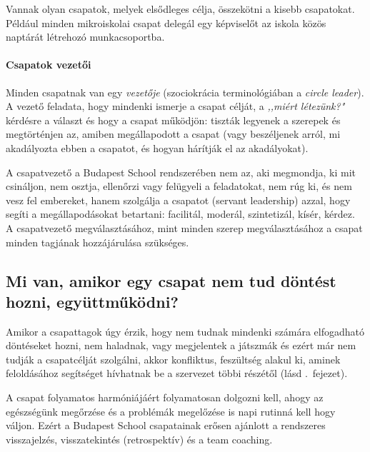 Vannak olyan csapatok, melyek elsődleges célja, összekötni a kisebb
csapatokat. Például minden mikroiskolai csapat delegál egy képviselőt az
iskola közös naptárát létrehozó munkacsoportba.


\paragraph{Csapatok vezetői}

Minden csapatnak van egy \emph{vezetője} (szociokrácia terminológiában a
\emph{circle leader}). A vezető feladata, hogy mindenki ismerje a csapat
célját, a \emph{,,miért létezünk?"} kérdésre a választ és hogy a csapat
működjön: tiszták legyenek a szerepek és megtörténjen az, amiben
megállapodott a csapat (vagy beszéljenek arról, mi akadályozta ebben a
csapatot, és hogyan hárítják el az akadályokat).

A csapatvezető a Budapest School rendszerében nem az, aki megmondja, ki
mit csináljon, nem osztja, ellenőrzi vagy felügyeli a feladatokat, nem
rúg ki, és nem vesz fel embereket, hanem szolgálja a csapatot (servant
leadership) azzal, hogy segíti a megállapodásokat betartani: facilitál,
moderál, szintetizál, kísér, kérdez. A csapatvezető megválasztásához,
mint minden szerep megválasztásához a csapat minden tagjának
hozzájárulása szükséges.


\subsection{Mi van, amikor egy csapat nem tud döntést hozni,
együttműködni?}

Amikor a csapattagok úgy érzik, hogy nem tudnak mindenki számára
elfogadható döntéseket hozni, nem haladnak, vagy megjelentek a játszmák
és ezért már nem tudják a csapatcélját szolgálni, akkor konfliktus,
feszültség alakul ki, aminek feloldásához segítséget hívhatnak be a
szervezet többi részétől (lásd .~fejezet).

A csapat folyamatos harmóniájáért folyamatosan dolgozni kell, ahogy az
egészségünk megőrzése és a problémák megelőzése is napi rutinná kell
hogy váljon. Ezért a Budapest School csapatainak erősen ajánlott a
rendszeres visszajelzés, visszatekintés (retrospektív) és a team
coaching.